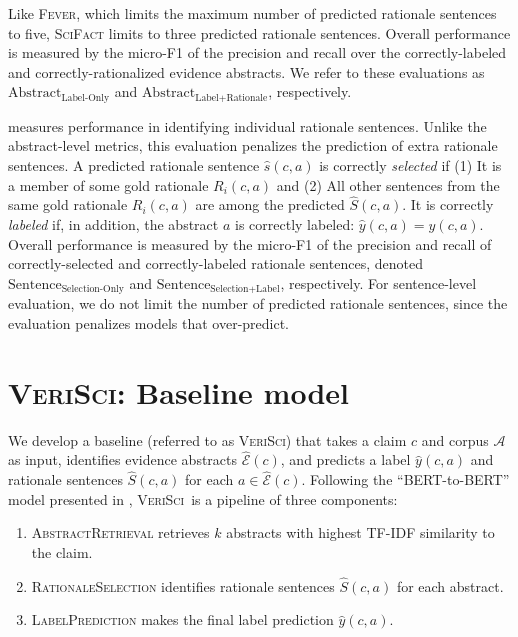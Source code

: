\documentclass[11pt,a4paper]{article}
\newcommand{\ours}{\textsc{SciFact}\xspace}
\newcommand{\sysname}{\textsc{VeriSci}\xspace}
\newcommand{\fever}{\textsc{Fever}\xspace}
\newcommand{\bert}{\textsc{BERT}\xspace}
\newcommand{\yhat}{\widehat{y}}
\newcommand{\Shat}{\widehat{S}}
\newcommand{\shat}{\widehat{s}}
\newcommand{\Ehat}{\widehat{\cE}}
\newcommand{\abstractLabelOnly}{$\textrm{Abstract}_{\textrm{Label-Only}}$\xspace}
\newcommand{\abstractLabelRationale}{$\textrm{Abstract}_{\textrm{Label+Rationale}}$\xspace}
\newcommand{\sentenceSelectionOnly}{$\textrm{Sentence}_{\textrm{Selection-Only}}$\xspace}
\newcommand{\sentenceSelectionLabel}{$\textrm{Sentence}_{\textrm{Selection+Label}}$\xspace}
\newcommand{\componentone}{\textsc{AbstractRetrieval}\xspace}
\newcommand{\componenttwo}{\textsc{RationaleSelection}\xspace}
\newcommand{\componentthree}{\textsc{LabelPrediction}\xspace}
\newcommand{\cA}{{\mathcal{A}}}
\newcommand{\cE}{{\mathcal{E}}}
\begin{document}
Like \fever, which limits the maximum number of predicted rationale sentences to five, \ours limits to three predicted rationale sentences. Overall performance is measured by the micro-F1 of the precision and recall over the correctly-labeled and correctly-rationalized evidence abstracts. We refer to these evaluations as \abstractLabelOnly and \abstractLabelRationale, respectively.

\vspace{.2cm}  measures performance in identifying individual rationale sentences. Unlike the abstract-level metrics, this evaluation penalizes the prediction of extra rationale sentences. A predicted rationale sentence $\shat(c, a)$ is correctly \emph{selected} if (1) It is a member of some gold rationale $R_i(c, a)$ and (2) All other sentences from the same gold rationale $R_i(c, a)$ are among the predicted $\Shat(c, a)$. It is correctly \emph{labeled} if, in addition, the abstract $a$ is correctly labeled: $\yhat(c, a) = y(c, a)$. Overall performance is measured by the micro-F1 of the precision and recall of correctly-selected and correctly-labeled rationale sentences, denoted \sentenceSelectionOnly and \sentenceSelectionLabel, respectively. For sentence-level evaluation, we do not limit the number of predicted rationale sentences, since the evaluation penalizes models that over-predict.
 \section{\sysname: Baseline model} \label{sec:baselines}
We develop a baseline (referred to as \sysname) that takes a claim $c$ and corpus $\cA$ as input, identifies evidence abstracts $\Ehat(c)$, and predicts a label $\yhat(c,a)$ and rationale sentences $\Shat(c, a)$ for each $a \in \Ehat(c)$.  Following the ``\bert-to-\bert''  model presented in \cite{DeYoung2019ERASERAB,Soleimani2019BERTFE}, \sysname\ is a pipeline of three components:

\begin{enumerate}[leftmargin=*]
    \item \componentone retrieves $k$ abstracts with highest TF-IDF similarity to the claim.
    \item \componenttwo identifies rationale sentences $\Shat(c, a)$ for each abstract.
    \item \componentthree makes the final label prediction $\yhat(c, a)$.
\end{enumerate}
\end{document}
